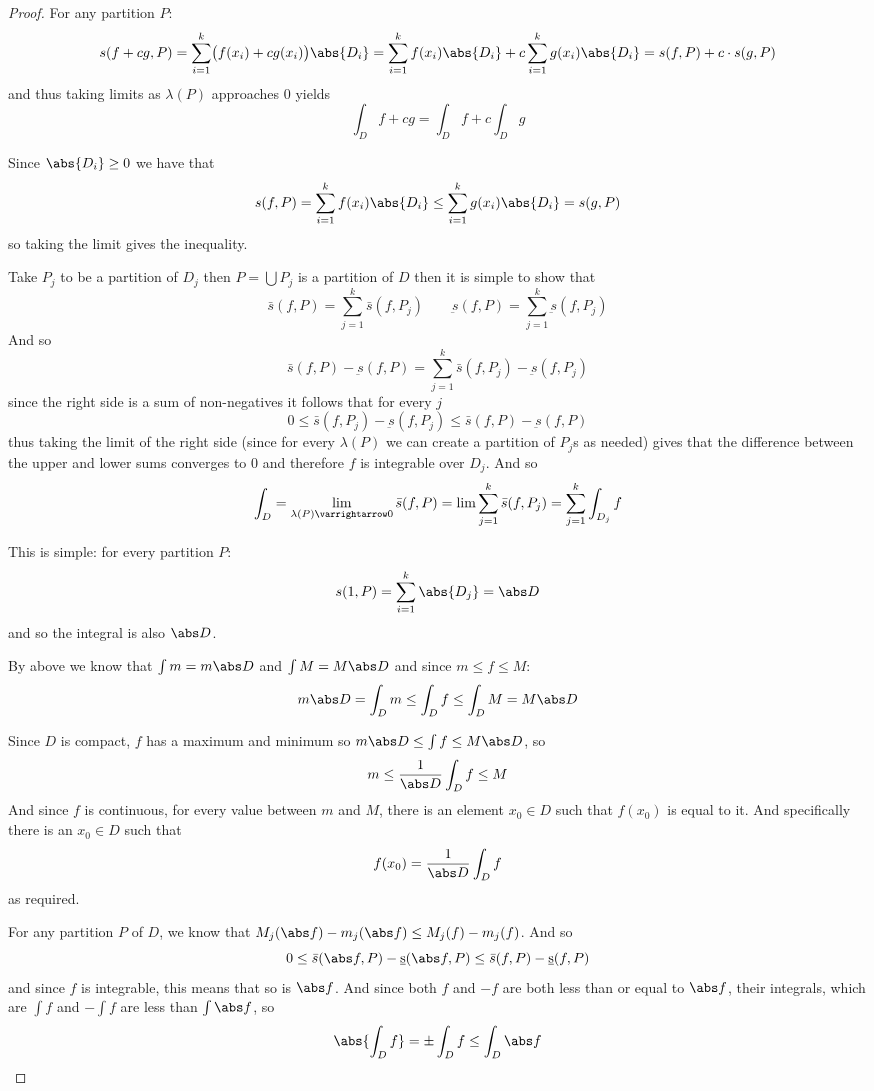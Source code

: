 \documentclass[10pt]{article}
\begin{document}
\begin{proof}

    \benum
        \item For any partition $P$:
            \[ s(f+cg,P) = \sum_{i=1}^k\bigl(f(x_i)+cg(x_i)\bigr)\abs{D_i} = \sum_{i=1}^k f(x_i)\abs{D_i} + c\sum_{i=1}^k g(x_i)\abs{D_i} =
            s(f,P) + c\cdot s(g,P) \]
            and thus taking limits as $\lambda(P)$ approaches $0$ yields
            \[ \int_D f+cg = \int_D f + c\int_D g \]
        \item Since $\abs{D_i}\geq0$ we have that
            \[ s(f,P) = \sum_{i=1}^k f(x_i)\abs{D_i} \leq \sum_{i=1}^k g(x_i)\abs{D_i} = s(g,P) \]
            so taking the limit gives the inequality.
        \item Take $P_j$ to be a partition of $D_j$ then $P=\bigcup P_j$ is a partition of $D$ then it is simple to show that
            \[ \bar s(f,P) = \sum_{j=1}^k \bar s(f,P_j) \qquad \underbar s(f,P) = \sum_{j=1}^k \underbar s(f,P_j) \]
            And so
            \[ \bar s(f,P) - \underbar s(f,P) = \sum_{j=1}^k\bar s(f,P_j) - \underbar s(f,P_j) \]
            since the right side is a sum of non-negatives it follows that for every $j$
            \[ 0 \leq \bar s(f,P_j) - \underbar s(f,P_j) \leq \bar s(f,P) - \underbar s(f,P) \]
            thus taking the limit of the right side (since for every $\lambda(P)$ we can create a partition of $P_j$s as needed) gives that the
            difference between the upper and lower sums converges to $0$ and therefore $f$ is integrable over $D_j$.
            And so
            \[ \int_D = \lim_{\lambda(P)\varrightarrow0}\bar s(f,P) = \lim\sum_{j=1}^k\bar s(f,P_j) = \sum_{j=1}^k\int_{D_j} f \]
        \item This is simple: for every partition $P$:
            \[ s(1,P) = \sum_{i=1}^k \abs{D_j} = \abs D \]
            and so the integral is also $\abs D$.
        \item By above we know that $\int m = m\abs D$ and $\int M = M\abs D$ and since $m\leq f\leq M$:
            \[ m\abs D = \int_D m \leq \int_D f \leq \int_D M = M\abs D \]
        \item Since $D$ is compact, $f$ has a maximum and minimum so $m\abs D\leq\int f\leq M\abs D$, so
            \[ m\leq\frac1{\abs D}\int_D f\leq M \]
            And since $f$ is continuous, for every value between $m$ and $M$, there is an element $x_0\in D$ such that $f(x_0)$ is equal to it.
            And specifically there is an $x_0\in D$ such that
            \[ f(x_0) = \frac1{\abs D}\int_D f \]
            as required.
        \item For any partition $P$ of $D$, we know that $M_j(\abs f)-m_j(\abs f)\leq M_j(f)-m_j(f)$.
            And so
            \[ 0\leq\bar s(\abs f, P) - \underbar s(\abs f, P) \leq \bar s(f,P) - \underbar s(f,P) \]
            and since $f$ is integrable, this means that so is $\abs f$.
            And since both $f$ and $-f$ are both less than or equal to $\abs f$, their integrals, which are $\int f$ and $-\int f$ are less than
            $\int\abs f$, so
            \[ \abs{\int_D f} = \pm\int_D f \leq \int_D\abs f \]
    \eenum


\end{proof}
\end{document}
